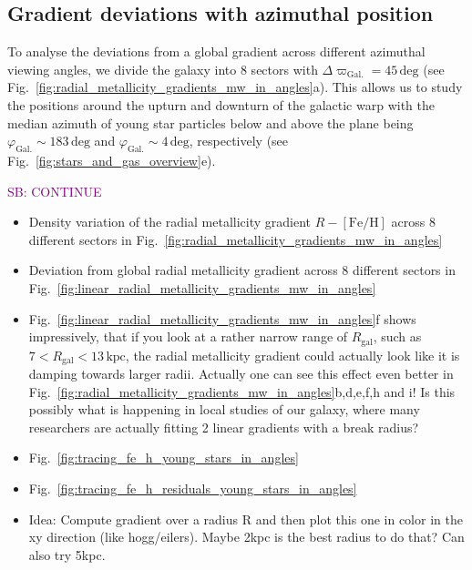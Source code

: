 \documentclass[fleqn,usenatbib]{mnras}
\newcommand{\SB}[1]{{\textcolor{purple}{SB: #1}}}
\begin{document}
\subsection{Gradient deviations with azimuthal position}
\label{sec:coherence_azimuth_radial_metallicity_gradients}

To analyse the deviations from a global gradient across different azimuthal viewing angles, we divide the galaxy into 8 sectors with $\Delta \varpi_\mathrm{Gal.} = 45\,\mathrm{deg}$ (see Fig.~\ref{fig:radial_metallicity_gradients_mw_in_angles}a). This allows us to study the positions around the upturn and downturn of the galactic warp with the median azimuth of young star particles below and above the plane being $\varphi_\mathrm{Gal.} \sim 183\,\mathrm{deg}$ and $\varphi_\mathrm{Gal.} \sim 4\,\mathrm{deg}$, respectively (see Fig.~\ref{fig:stars_and_gas_overview}e).

\SB{CONTINUE}

\begin{itemize}
    \item Density variation of the radial metallicity gradient $R-\mathrm{[Fe/H]}$ across 8 different sectors in Fig.~\ref{fig:radial_metallicity_gradients_mw_in_angles}
    \item Deviation from global radial metallicity gradient across 8 different sectors in Fig.~\ref{fig:linear_radial_metallicity_gradients_mw_in_angles}
    \item Fig.~\ref{fig:linear_radial_metallicity_gradients_mw_in_angles}f shows impressively, that if you look at a rather narrow range of $R_\mathrm{gal}$, such as $7 < R_\mathrm{gal} < 13\,\mathrm{kpc}$, the radial metallicity gradient could actually look like it is damping towards larger radii. Actually one can see this effect even better in Fig.~\ref{fig:radial_metallicity_gradients_mw_in_angles}b,d,e,f,h and i! Is this possibly what is happening in local studies of our galaxy, where many researchers are actually fitting 2 linear gradients with a break radius?
    \item Fig.~\ref{fig:tracing_fe_h_young_stars_in_angles}
    \item Fig.~\ref{fig:tracing_fe_h_residuals_young_stars_in_angles}
    \item Idea: Compute gradient over a radius R and then plot this one in color in the xy direction (like hogg/eilers). Maybe 2kpc is the best radius to do that? Can also try 5kpc.
\end{itemize}
\end{document}
